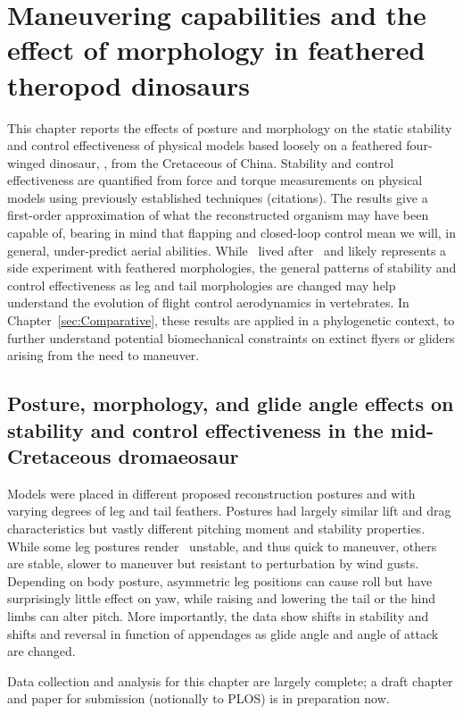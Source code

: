 \section{Maneuvering capabilities and the effect of morphology in feathered theropod dinosaurs}
\label{sec:Microraptor}
This chapter reports the effects of posture and morphology on the static stability and control effectiveness of physical models based loosely on a feathered four-winged dinosaur, \Microraptorgui \citep{Xu:2003}, from the Cretaceous of China.   Stability and control effectiveness are quantified from force and torque measurements on physical models using previously established techniques (citations).  The results give a first-order approximation of what the reconstructed organism may have been capable of, bearing in mind that flapping and closed-loop control mean we will, in general, under-predict aerial abilities.  While \Mgui\ lived after \Archaeopteryx\ and likely represents a side experiment with feathered morphologies, the general patterns of stability and control effectiveness as leg and tail morphologies are changed may help understand the evolution of flight control aerodynamics in vertebrates.  In Chapter~\ref{sec:Comparative}, these results are applied in a phylogenetic context, to further understand potential biomechanical constraints on extinct flyers or gliders arising from the need to maneuver. 

\subsection{Posture, morphology, and glide angle effects on stability and control effectiveness in the mid-Cretaceous dromaeosaur \Microraptorgui}
Models were placed in different proposed reconstruction postures and with varying degrees of leg and tail feathers.  Postures had largely similar lift and drag characteristics but vastly different pitching moment and stability properties.  While some leg postures render \Mgui\ unstable, and thus quick to maneuver, others are stable, slower to maneuver but resistant to perturbation by wind gusts.  Depending on body posture, asymmetric leg positions can cause roll but have surprisingly little effect on yaw, while raising and lowering the tail or the hind limbs can alter pitch.  More importantly, the data show shifts in stability and shifts and reversal in function of appendages as glide angle and angle of attack are changed.  

Data collection and analysis for this chapter are largely complete; a draft chapter and paper for submission (notionally to PLOS) is in preparation now. 

